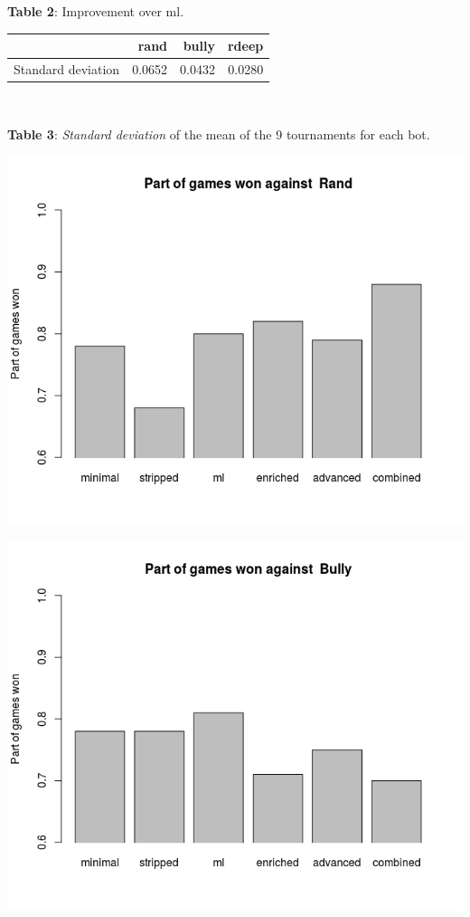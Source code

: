 \documentclass[a4paper,11pt]{article}
\begin{document}
\textbf{Table 2}: Improvement over ml. \\
\begin{center}
\begin{tabular}{| r | r | r | r |}
\hline
      & \textbf{rand} & \textbf{bully} & \textbf{rdeep}\\ \hline
      Standard deviation & 0.0652 & 0.0432 & 0.0280    \\ \hline
\end{tabular} \\
\end{center}

\textbf{Table 3}: \textit{Standard deviation} of the mean of the 9 tournaments for each bot. \\

\begin{center}
\begin{minipage}{0.49\linewidth}
\includegraphics[width=\linewidth]{images/barplotRand.png}
\end{minipage}
\hfill
\begin{minipage}{0.49\linewidth}
\includegraphics[width=\linewidth]{images/barplotBully.png}

\end{minipage}
\end{center}
\end{document}
